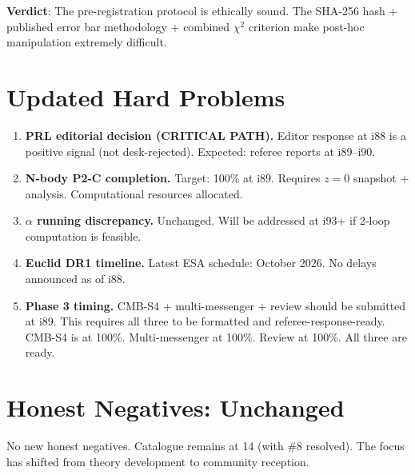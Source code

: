 \documentclass[11pt,a4paper]{article}
\begin{document}
\textbf{Verdict}: The pre-registration protocol is ethically sound. The SHA-256 hash + published error bar methodology + combined $\chi^2$ criterion make post-hoc manipulation extremely difficult.

\section{Updated Hard Problems}

\begin{enumerate}
\item \textbf{PRL editorial decision (CRITICAL PATH).} Editor response at i88 is a positive signal (not desk-rejected). Expected: referee reports at i89--i90.

\item \textbf{N-body P2-C completion.} Target: 100\% at i89. Requires $z = 0$ snapshot + analysis. Computational resources allocated.

\item \textbf{$\alpha$ running discrepancy.} Unchanged. Will be addressed at i93+ if 2-loop computation is feasible.

\item \textbf{Euclid DR1 timeline.} Latest ESA schedule: October 2026. No delays announced as of i88.

\item \textbf{Phase 3 timing.} CMB-S4 + multi-messenger + review should be submitted at i89. This requires all three to be formatted and referee-response-ready. CMB-S4 is at 100\%. Multi-messenger at 100\%. Review at 100\%. All three are ready.
\end{enumerate}

\section{Honest Negatives: Unchanged}

No new honest negatives. Catalogue remains at 14 (with \#8 resolved). The focus has shifted from theory development to community reception.
\end{document}
